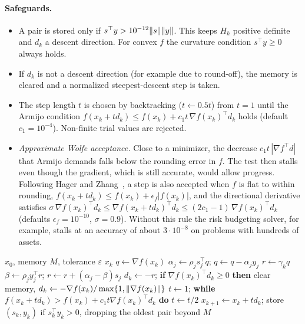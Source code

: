 \paragraph{Safeguards.}
\begin{itemize}
  \item A pair is stored only if $s^\top y > 10^{-12}\lVert s\rVert\lVert y\rVert$.
        This keeps $H_k$ positive definite and $d_k$ a descent direction.
        For convex $f$ the curvature condition $s^\top y\ge 0$ always holds.
  \item If $d_k$ is not a descent direction (for example due to round-off), the memory is
        cleared and a normalized steepest-descent step is taken.
  \item The step length $t$ is chosen by backtracking ($t\gets 0.5t$) from $t=1$
        until the Armijo condition
        $f(x_k+t d_k)\le f(x_k)+c_1 t\,\nabla f(x_k)^\top d_k$ holds
        (default $c_1=10^{-4}$). Non-finite trial values are rejected.
  \item \emph{Approximate Wolfe acceptance.} Close to a minimizer, the decrease
        $c_1 t\,|\nabla f^\top d|$ that Armijo demands falls below the rounding
        error in $f$. The test then stalls even though the gradient, which
        is still accurate, would allow progress. Following Hager and
        Zhang~\cite{hager2005}, a step is also accepted when $f$ is flat to
        within rounding, $f(x_k+td_k)\le f(x_k)+\epsilon_f|f(x_k)|$, and the
        directional derivative satisfies
        $\sigma\,\nabla f(x_k)^\top d_k \le \nabla f(x_k+td_k)^\top d_k \le (2c_1-1)\,\nabla f(x_k)^\top d_k$
        (defaults $\epsilon_f=10^{-10}$, $\sigma=0.9$). Without this rule the risk
        budgeting solver, for example, stalls at an accuracy of about $3\cdot 10^{-8}$ on
        problems with hundreds of assets.
\end{itemize}

\begin{algorithm}[ht]
\caption{L-BFGS with Armijo backtracking}\label{co:alg:lbfgs}
\begin{algorithmic}[1]
\Require $x_0$, memory $M$, tolerance $\varepsilon$
   \Return $x_k$ \EndIf
  \State $q\gets\nabla f(x_k)$
   
    \State $\alpha_j\gets\rho_j s_j^\top q$; \quad $q\gets q-\alpha_j y_j$
  \EndFor
  \State $r\gets\gamma_k q$
   
    \State $\beta\gets\rho_j y_j^\top r$; \quad $r\gets r+(\alpha_j-\beta)s_j$
  \EndFor
  \State $d_k\gets -r$; \textbf{if} $\nabla f(x_k)^\top d_k\ge 0$ \textbf{then} clear memory, $d_k\gets-\nabla f(x_k)/\max\{1,\lVert \nabla f(x_k)\rVert\}$
  \State $t\gets 1$; \textbf{while} $f(x_k+td_k)>f(x_k)+c_1t\nabla f(x_k)^\top d_k$ \textbf{do} $t\gets t/2$
  \State $x_{k+1}\gets x_k+td_k$; store $(s_k,y_k)$ if $s_k^\top y_k>0$, dropping the oldest pair beyond $M$
\EndFor
\end{algorithmic}
\end{algorithm}

